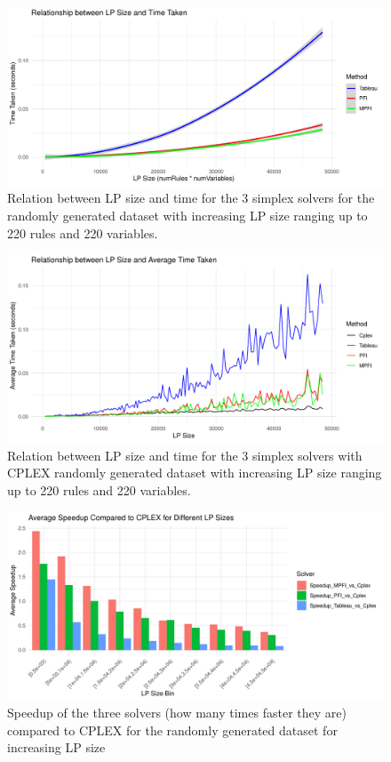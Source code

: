 \begin{figure}[!htb]
    \centering
    \includegraphics[width=\linewidth]{figures/size_time_random_large.pdf}
    \caption{Relation between LP size and time for the 3 simplex solvers for the randomly generated
        dataset with increasing LP size ranging up to 220 rules and 220 variables.}
    \label{fig:size_time_random_large}
\end{figure}

\begin{figure}[p]
    \includegraphics[width=0.8\paperwidth, height=\paperheight, keepaspectratio]{figures/cplex_vs_all_random_large.pdf}
    \caption{Relation between LP size and time for the 3 simplex solvers with CPLEX randomly generated
        dataset with increasing LP size ranging up to 220 rules and 220 variables.}
    \label{cplex_vs_all_random_large}
\end{figure}

\begin{figure}[!htb]
    \centering
    \includegraphics[width=\linewidth]{figures/speedup_vs_cplex_random_200.pdf}
    \caption{Speedup of the three solvers (how many times faster they are) compared to CPLEX for
        the randomly generated dataset for increasing LP size}
    \label{fig:speedup_cplex_random.pdf}
\end{figure}

